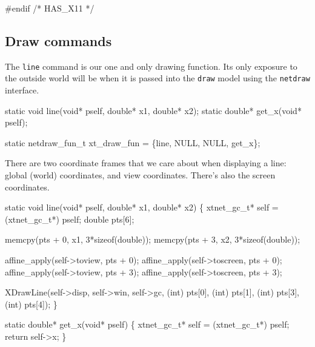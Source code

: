 #endif /* HAS_X11 */
\nwendcode{}\nwdocspar


\subsection{Draw commands}

The {\tt{}line} command is our one and only drawing function.  Its only
exposure to the outside world will be when it is passed into the
{\tt{}draw} model using the {\tt{}netdraw} interface.

\nwenddocs{}\endmoddef
static void line(void* pself, double* x1, double* x2);
static double* get_x(void* pself);

static netdraw_fun_t xt_draw_fun = \{line, NULL, NULL, get_x\};

\nwendcode{}\nwdocspar

There are two coordinate frames that we care about when displaying
a line: global (world) coordinates, and view coordinates.
There's also the screen coordinates. %

\nwenddocs{}\endmoddef
static void line(void* pself, double* x1, double* x2)
\{
    xtnet_gc_t* self = (xtnet_gc_t*) pself;
    double pts[6];

    memcpy(pts + 0, x1, 3*sizeof(double));
    memcpy(pts + 3, x2, 3*sizeof(double));

    affine_apply(self->toview,   pts + 0);
    affine_apply(self->toscreen, pts + 0);    
    affine_apply(self->toview,   pts + 3);
    affine_apply(self->toscreen, pts + 3);

    XDrawLine(self->disp, self->win, self->gc, 
              (int) pts[0], (int) pts[1], (int) pts[3], (int) pts[4]);
\}

\nwendcode{}\nwdocspar

\nwenddocs{}\plusendmoddef
static double* get_x(void* pself)
\{
    xtnet_gc_t* self = (xtnet_gc_t*) pself;
    return self->x;
\}

